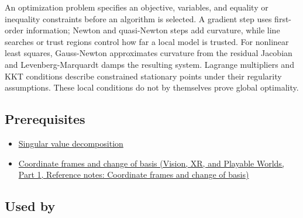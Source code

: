 An optimization problem specifies an objective, variables, and equality or inequality constraints before an algorithm is selected. A gradient step uses first-order information; Newton and quasi-Newton steps add curvature, while line searches or trust regions control how far a local model is trusted. For nonlinear least squares, Gauss-Newton approximates curvature from the residual Jacobian and Levenberg-Marquardt damps the resulting system. Lagrange multipliers and KKT conditions describe constrained stationary points under their regularity assumptions. These local conditions do not by themselves prove global optimality.

\subsection{Prerequisites}\label{appendix-29f4bea4c2bb-prerequisites}

\hypertarget{appendix-29f4bea4c2bb-prerequisites}{}

\begin{itemize}
\tightlist
\item
  \hyperref[appendix-1fad5e7f36fa]{Singular value decomposition}
\item
  \href{../07-Vision-XR-and-Playable-Worlds-P01/main.pdf\#appendix-1bae9457dbc3}{Coordinate frames and change of basis (Vision, XR, and Playable Worlds, Part 1, Reference notes: Coordinate frames and change of basis)}
\end{itemize}

\subsection{Used by}\label{appendix-29f4bea4c2bb-used-by}

\hypertarget{appendix-29f4bea4c2bb-used-by}{}

